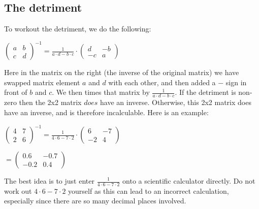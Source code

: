 \documentclass[options]{article}
\begin{document}
\subsection{The detriment}
To workout the detriment, we do the following:
\begin{center}
    \(
        \begin{pmatrix}
            a & b\\
            c & d
        \end{pmatrix}
        ^{-1} 
        =
        \frac{1}{a \cdot d - b \cdot c}
        \cdot
        \begin{pmatrix}
            d & -b\\
            -c & a
        \end{pmatrix}
    \)
\end{center}
Here in the matrix on the right (the inverse of the original matrix) we have swapped matrix element \(a\) and \(d\) with each other, and then added a \(-\) sign in front of \(b\) and \(c\). 
We then times that matrix by \( \frac{1}{{a \cdot d - b \cdot c}} \). If the detriment is non-zero then the 2x2 matrix \(\textit{does}\) have an inverse. Otherwise, this 2x2 matrix does have an inverse,
and is therefore incalculable. Here is an example:
\begin{center}
    \(
        \begin{pmatrix}
            4 & 7\\
            2 & 6
        \end{pmatrix}
        ^{-1} 
        =
        \frac{1}{4 \cdot 6 - 7 \cdot 2}
        \cdot
        \begin{pmatrix}
            6 & -7\\
            -2 & 4
        \end{pmatrix}
    \)

    \(
        =
        \begin{pmatrix}
            0.6 & -0.7\\
            -0.2 & 0.4
        \end{pmatrix}
    \)
\end{center}
The best idea is to just enter \(\frac{1}{4 \cdot 6 - 7 \cdot 2}\) onto a scientific calculator directly. Do not work out
\( 4 \cdot 6 - 7 \cdot 2 \) yourself as this can lead to an incorrect calculation, especially since there are so many decimal places involved. 
\end{document}
